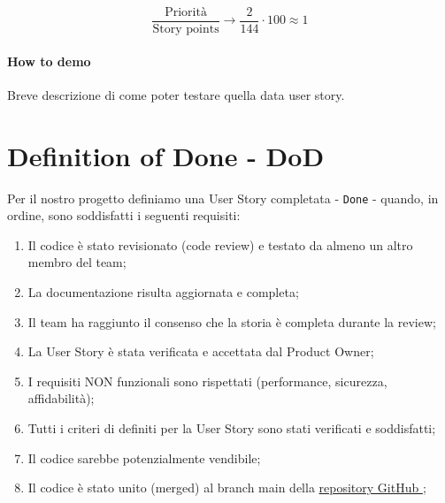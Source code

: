 \begin{equation*}
    \frac{\text{Priorità}}{\text{Story points}} \longrightarrow \frac{2}{144} \cdot 100 \approx 1
\end{equation*}

\paragraph{How to demo} Breve descrizione di come poter testare quella data user story.

\newpage


\section*{Definition of Done - DoD }

Per il nostro progetto definiamo una User Story completata - \verb|Done| - quando, in ordine, sono soddisfatti i seguenti requisiti: 

\begin{enumerate}
    \item Il codice è stato revisionato (code review) e testato da almeno un altro membro del team;
    \item La documentazione risulta aggiornata e completa;
    \item Il team ha raggiunto il consenso che la storia è completa durante la review;
    \item La User Story è stata verificata e accettata dal Product Owner;
    \item I requisiti NON funzionali sono rispettati (performance, sicurezza, affidabilità);
    \item Tutti i criteri di definiti per la User Story sono stati verificati e soddisfatti;
    \item Il codice sarebbe potenzialmente vendibile;
    \item Il codice è stato unito (merged) al branch main della \href{https://github.com/CristianoBerardo/Progetto-Ingegneria-del-Software}{repository GitHub \faGithub };
\end{enumerate}